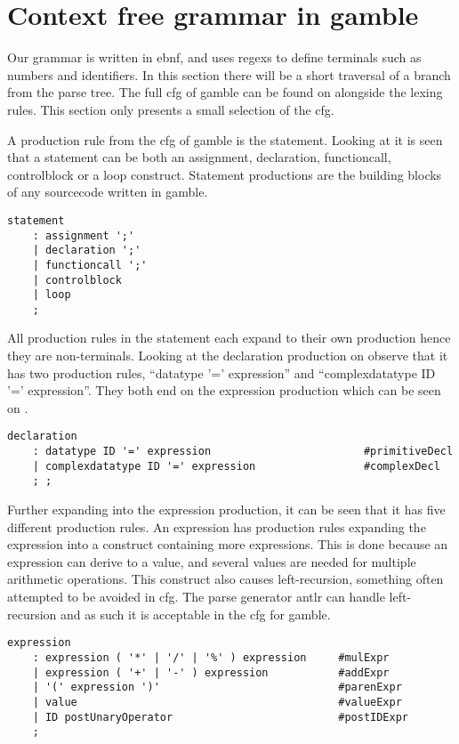 \section{Context free grammar in gamble}
Our grammar is written in \acrfull{ebnf}, and uses \acrfull{regex}s to define terminals such as numbers and identifiers.
In this section there will be a short traversal of a branch from the parse tree.
The full \acrshort{cfg} of \gls{gamble} can be found on  alongside the lexing rules.
This section only presents a small selection of the \acrshort{cfg}.

A production rule from the \acrshort{cfg} of \gls{gamble} is the statement. 
Looking at  it is seen that a statement can be both an assignment, declaration, functioncall, controlblock or a loop construct. 
Statement productions are the building blocks of any sourcecode written in \gls{gamble}.

\begin{lstlisting}[caption={\acrshort{cfg} Statement},frame=tlrb,label={lst:statements},numbers=none]
statement
    : assignment ';'
    | declaration ';'
    | functioncall ';'
    | controlblock
    | loop
    ;
\end{lstlisting}

All production rules in the statement each expand to their own production hence they are non-terminals.
Looking at the declaration production on  observe that it has two production rules, ``datatype '=' expression'' and ``complexdatatype ID '=' expression''. 
They both end on the expression production which can be seen on .

\begin{lstlisting}[caption={\acrshort{cfg} Declaration},frame=tlrb,label={lst:declaration},numbers=none]
declaration
    : datatype ID '=' expression                        #primitiveDecl
    | complexdatatype ID '=' expression                 #complexDecl
    ; ;
\end{lstlisting}

Further expanding into the expression production, it can be seen that it has five different production rules.
An expression has production rules expanding the expression into a construct containing more expressions.
This is done because an expression can derive to a value, and several values are needed for multiple arithmetic operations.
This construct also causes left-recursion, something often attempted to be avoided in \acrshort{cfg}.
The parse generator \acrshort{antlr} can handle left-recursion and as such it is acceptable in the \acrshort{cfg} for \gls{gamble}.
\begin{lstlisting}[caption={\acrshort{cfg} Expression},frame=tlrb,label={lst:expression},numbers=none]
expression
    : expression ( '*' | '/' | '%' ) expression     #mulExpr
    | expression ( '+' | '-' ) expression           #addExpr
    | '(' expression ')'                            #parenExpr
    | value                                         #valueExpr
    | ID postUnaryOperator                          #postIDExpr
    ;
\end{lstlisting}
  
